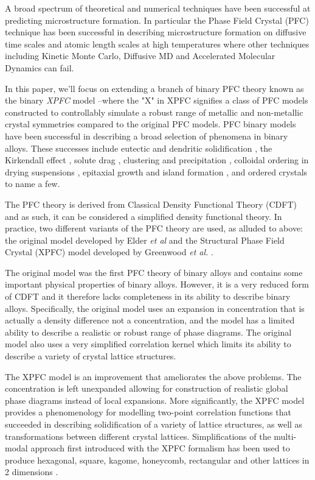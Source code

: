 \documentclass[showkeys, prb, reprint]{revtex4-1}
\begin{document}
A broad spectrum of theoretical and numerical techniques have been successful
at predicting microstructure formation. In particular the Phase Field Crystal
(PFC) technique has been successful in describing microstructure formation on
diffusive time scales and atomic length scales at high temperatures where other
techniques including Kinetic Monte Carlo, Diffusive MD and Accelerated
Molecular Dynamics can fail.


In this paper, we'll focus on extending a branch of binary PFC theory known as
the binary {\it XPFC} model --where the "X" in XPFC signifies a class of PFC
models  constructed to controllably simulate a robust range of metallic and
non-metallic crystal symmetries compared to the original PFC models. PFC binary
models have been successful in describing a broad selection of phenomena in
binary alloys.  These successes include eutectic and dendritic solidification
\cite{ELDER07}, the Kirkendall effect \cite{ELDER11_KIRKENDALL, LU15}, solute
drag \cite{GREENWOOD12}, clustering and precipitation \cite{FALLAH12, FALLAH13,
FALLAH13_AlCu_experiment}, colloidal ordering in drying suspensions
\cite{GANAI13}, epitaxial growth and island formation \cite{ELDER10_NANOISLAND,
LU16}, and ordered crystals \cite{ALSTER17} to name a few. 

The PFC theory is derived from Classical Density Functional Theory (CDFT) and
as such, it can be considered a simplified density functional theory.  In
practice, two different variants of the PFC theory are used, as alluded to
above: the original model developed by Elder \textit{et al} \cite{ELDER07} and
the Structural Phase Field Crystal (XPFC) model developed by Greenwood
\textit{et al.} \cite{GREENWOOD11_BINARY}.

The original model was the first PFC theory of binary alloys and contains some
important physical properties of binary alloys. However, it is a very reduced
form of CDFT and it therefore lacks completeness in its ability to describe
binary alloys. Specifically, the original model uses an expansion in
concentration that is actually a density difference not a concentration, and
the model has a limited ability to describe a realistic or robust range of
phase diagrams. The original model also uses a very simplified correlation
kernel which limits its ability to describe a variety of crystal lattice
structures.

The XPFC model is an improvement that ameliorates the above problems. The
concentration is left unexpanded allowing for construction of realistic global
phase diagrams instead of local expansions. More significantly, the XPFC model
provides a phenomenology for modelling two-point correlation functions that
succeeded in describing solidification of a variety of lattice structures, as
well as transformations between different crystal lattices. Simplifications of
the multi-modal approach first introduced with the XPFC formalism has been used
to produce hexagonal, square, kagome, honeycomb, rectangular and other lattices
in 2 dimensions \cite{MKHONTA13}.
\end{document}
